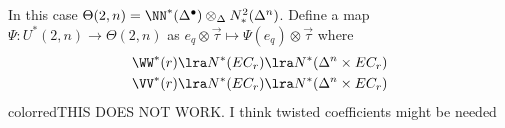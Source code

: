 In this case $\Theta(2,n) = \NN^*(\Delta^\bullet)\otimes_{\Delta} N_*^2(\Delta^n)$. Define a map $\Psi\colon U^*(2,n)\to \Theta(2,n)$ as $e_q\otimes \vec{\tau}\mapsto \Psi(e_q)\otimes \vec{\tau}$ where 
\begin{align*}
    \WW^*(r)\lra N^*(EC_r) \lra N^*(\Delta^n\times EC_r) \\
    \VV^*(r)\lra N^*(EC_r) \lra N^*(\Delta^n\times EC_r) \\
\end{align*}
{color{red}THIS DOES NOT WORK. I think twisted coefficients might be needed}
